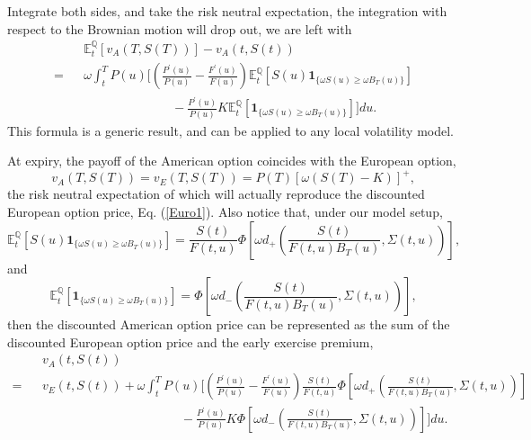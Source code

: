 \documentclass[12pt]{article}
\begin{document}
    Integrate both sides, and take the risk neutral expectation, the integration with respect to the Brownian motion
    will drop out, we are left with
    \begin{eqnarray}
      &&{\mathbb E}_t^{\mathbb Q}\left[v_A(T,S(T))\right]-v_A(t,S(t)) \nonumber\\
      = &&\omega\int_t^T P(u)\Bigg[\left(\frac{P^{\prime}(u)}{P(u)}-\frac{F^{\prime}(u)}{F(u)}\right)
                          {\mathbb E}_t^{\mathbb Q}\left[S(u)\mathbf{1}_{\{\omega S(u)\geq\omega B_T(u)\}}\right]\nonumber\\
        &&\quad\quad\quad\quad\quad\quad\quad- \frac{P^{\prime}(u)}{P(u)} K
                          {\mathbb E}_t^{\mathbb Q}\left[\mathbf{1}_{\{\omega S(u)\geq\omega B_T(u)\}}\right] \Bigg]du.
    \end{eqnarray}
    This formula is a generic result, and can be applied to any local volatility model.

    At expiry, the payoff of the American option coincides with the European option,
    \begin{equation}
      v_A(T,S(T)) = v_E(T,S(T))=P(T)\left[\omega\left(S(T)-K\right)\right]^+,
    \end{equation}
    the risk neutral expectation of which will actually reproduce the discounted European option price, Eq. (\ref{Euro1}).
    Also notice that, under our model setup,
    \begin{equation}
      {\mathbb E}_t^{\mathbb Q}\left[S(u)\mathbf{1}_{\{\omega S(u)\geq\omega B_T(u)\}}\right]
       = \frac{S(t)}{F(t,u)}\Phi\left[\omega d_+\left(\frac{S(t)}{F(t,u)B_T(u)}, \Sigma(t,u)\right)\right],
    \end{equation}
    and
    \begin{equation}
      {\mathbb E}_t^{\mathbb Q}\left[\mathbf{1}_{\{\omega S(u)\geq\omega B_T(u)\}}\right]
       = \Phi\left[\omega d_-\left(\frac{S(t)}{F(t,u)B_T(u)}, \Sigma(t,u)\right)\right],
    \end{equation}
    then the discounted American option price can be represented as the sum of the discounted European
    option price and the early exercise premium,
    \begin{eqnarray}
      \label{EEP}
      &&v_A(t,S(t))\nonumber\\
      =&&v_E(t,S(t))+\omega\int_t^TP(u)\Bigg[\left(\frac{P^{\prime}(u)}{P(u)}-\frac{F^{\prime}(u)}{F(u)}\right)
      \frac{S(t)}{F(t,u)}\Phi\left[\omega d_+\left(\frac{S(t)}{F(t,u)B_T(u)}, \Sigma(t,u)\right)\right]\nonumber\\
      &&\quad\quad\quad\quad\quad\quad\quad\quad\quad\quad\quad - \frac{P^{\prime}(u)}{P(u)} K
      \Phi\left[\omega d_-\left(\frac{S(t)}{F(t,u)B_T(u)}, \Sigma(t,u)\right)\right] \Bigg]du.
    \end{eqnarray}
\end{document}
